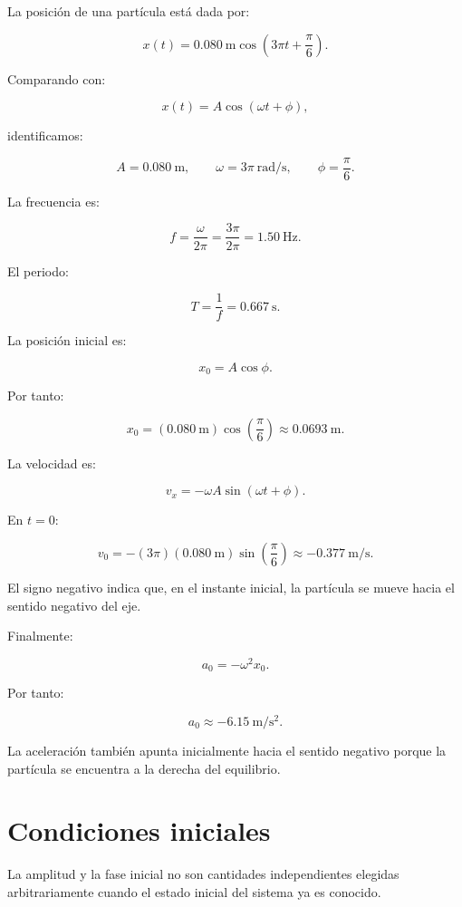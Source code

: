 \begin{ejemplo}
La posición de una partícula está dada por:

\[ x(t)=\SI{0.080}{\meter}\cos\left(3\pi t+\frac{\pi}{6}\right). \]

Comparando con:

\[ x(t)=A\cos(\omega t+\phi), \]

identificamos:

\[
A=\SI{0.080}{\meter},
\qquad
\omega=3\pi\ \si{\radian\per\second},
\qquad
\phi=\frac{\pi}{6}.
\]

La frecuencia es:

\[ f=\frac{\omega}{2\pi}=\frac{3\pi}{2\pi}=\SI{1.50}{\hertz}. \]

El periodo:

\[ T=\frac{1}{f}=\SI{0.667}{\second}. \]

La posición inicial es:

\[ x_0=A\cos\phi. \]

Por tanto:

\[ x_0=(\SI{0.080}{\meter})\cos\left(\frac{\pi}{6}\right)\approx\SI{0.0693}{\meter}. \]

La velocidad es:

\[ v_x=-\omega A\sin(\omega t+\phi). \]

En \(t=0\):

\[
v_0
=
-(3\pi)(\SI{0.080}{\meter})
\sin\left(\frac{\pi}{6}\right)
\approx
-\SI{0.377}{\meter\per\second}.
\]

El signo negativo indica que, en el instante inicial, la partícula se mueve hacia el sentido negativo del eje.

Finalmente:

\[ a_0=-\omega^2x_0. \]

Por tanto:

\[ a_0\approx-\SI{6.15}{\meter\per\second\squared}. \]

La aceleración también apunta inicialmente hacia el sentido negativo porque la partícula se encuentra a la derecha del equilibrio.
\end{ejemplo}

\section{Condiciones iniciales}

La amplitud y la fase inicial no son cantidades independientes elegidas arbitrariamente cuando el estado inicial del sistema ya es conocido.

